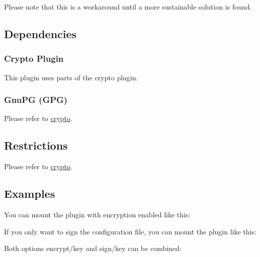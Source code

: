 Please note that this is a workaround until a more sustainable solution is found.\hypertarget{autotoc_md207_autotoc_md211}{}\subsection{Dependencies}\label{autotoc_md207_autotoc_md211}
\hypertarget{autotoc_md207_autotoc_md212}{}\subsubsection{Crypto Plugin}\label{autotoc_md207_autotoc_md212}
This plugin uses parts of the {\ttfamily crypto} plugin.\hypertarget{autotoc_md207_autotoc_md213}{}\subsubsection{Gnu\+P\+G (\+G\+P\+G)}\label{autotoc_md207_autotoc_md213}
Please refer to \mbox{\hyperlink{autotoc_md113_src_plugins_crypto_README_md}{crypto}}.\hypertarget{autotoc_md207_autotoc_md214}{}\subsection{Restrictions}\label{autotoc_md207_autotoc_md214}
Please refer to \mbox{\hyperlink{autotoc_md113_src_plugins_crypto_README_md}{crypto}}.\hypertarget{autotoc_md207_autotoc_md215}{}\subsection{Examples}\label{autotoc_md207_autotoc_md215}
You can mount the plugin with encryption enabled like this\+:


\begin{DoxyCode}{0}
\end{DoxyCode}


If you only want to sign the configuration file, you can mount the plugin like this\+:


\begin{DoxyCode}{0}
\end{DoxyCode}


Both options {\ttfamily encrypt/key} and {\ttfamily sign/key} can be combined\+:


\begin{DoxyCode}{0}
\end{DoxyCode}


